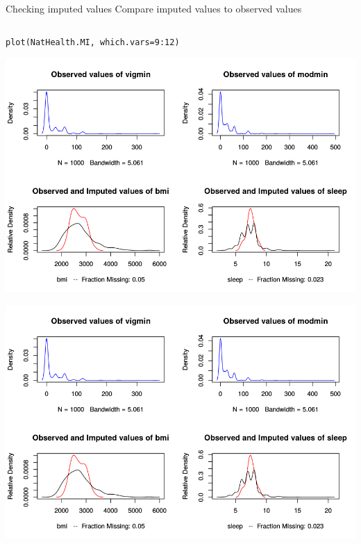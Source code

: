 \documentclass[table,smaller]{beamer}
\begin{document}
\begin{frame}[fragile,label=sec-6-4]{Checking imputed values}
 Compare imputed values to observed values

\begin{columns}  \begin{block}{}
\begin{verbatim}
plot(NatHealth.MI, which.vars=9:12)
\end{verbatim}

\includegraphics[width=.9\linewidth]{images/imputed1.png}

\includegraphics[width=.9\linewidth]{images/imputed1.png}

\end{block} \end{columns}
\end{frame}
\end{document}
